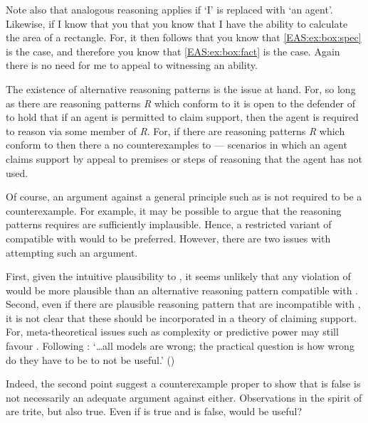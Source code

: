 \begin{note}[Alternatives]
  Note also that analogous reasoning applies if `I' is replaced with `an agent'.
  Likewise, if I know that you that you know that I have the ability to calculate the area of a rectangle.
  For, it then follows that you know that \ref{EAS:ex:box:spec} is the case, and therefore you know that \ref{EAS:ex:box:fact} is the case.
  Again there is no need for me to appeal to witnessing an ability.
\end{note}

\begin{note}[Box]
  The existence of alternative reasoning patterns is the issue at hand.
  For, so long as there are reasoning patterns \emph{R} which conform to \ESU{} it is open to the defender of \ESU{} to hold that if an agent is permitted to claim support, then the agent is required to reason via some member of \emph{R}.
  For, if there are reasoning patterns \emph{R} which conform to \ESU{} then there a no counterexamples to \ESU{} --- scenarios in which an agent claims support by appeal to premises or steps of reasoning that the agent has not used.

  Of course, an argument against a general principle such as \ESU{} is not required to be a counterexample.
  For example, it may be possible to argue that the reasoning patterns \ESU{} requires are sufficiently implausible.
  Hence, a restricted variant of \ESU{} compatible with \EAS{} would to be preferred.
  However, there are two issues with attempting such an argument.

  First, given the intuitive plausibility to \ESU{}, it seems unlikely that any violation of \ESU{} would be more plausible than an alternative reasoning pattern compatible with \ESU{}.
  Second, even if there are plausible reasoning pattern that are incompatible with \ESU{}, it is not clear that these should be incorporated in a theory of claiming support.
  For, meta-theoretical issues such as complexity or predictive power may still favour \ESU{}.
  Following \citeauthor{Box:1987vn}: `\dots all models are wrong; the practical question is how wrong do they have to be to not be useful.' (\Citeyear[74]{Box:1987vn})

  Indeed, the second point suggest a counterexample proper to show that \ESU{} is false is not necessarily an adequate argument against \ESU{} either.
  Observations in the spirit of \citeauthor{Box:1987vn} are trite, but also true.
  Even if \EAS{} is true and \ESU{} is false, would \EAS{} be useful?
\end{note}

